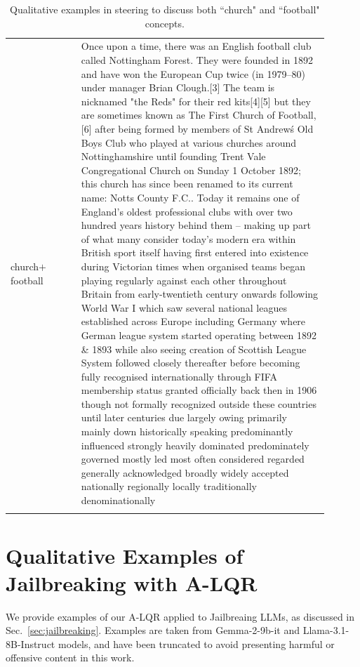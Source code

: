 \documentclass{article}
\theoremstyle{plain}
\theoremstyle{definition}
\theoremstyle{remark}
\begin{document}
\begin{table}[t]
\begin{tabular}{p{0.2\linewidth} p{0.7\linewidth}}
church$+$football & Once upon a time, there was an English football club called Nottingham Forest. They were founded in 1892 and have won the European Cup twice (in 1979–80) under manager Brian Clough.[3] The team is nicknamed "the Reds" for their red kits[4][5] but they are sometimes known as The First Church of Football,[6] after being formed by members of St Andrew\'s Old Boys Club who played at various churches around Nottinghamshire until founding Trent Vale Congregational Church on Sunday 1 October 1892; this church has since been renamed to its current name: Notts County F.C.. Today it remains one of England’s oldest professional clubs with over two hundred years history behind them – making up part of what many consider today’s modern era within British sport itself having first entered into existence during Victorian times when organised teams began playing regularly against each other throughout Britain from early-twentieth century onwards following World War I which saw several national leagues established across Europe including Germany where German league system started operating between 1892 \& 1893 while also seeing creation of Scottish League System followed closely thereafter before becoming fully recognised internationally through FIFA membership status granted officially back then in 1906 though not formally recognized outside these countries until later centuries due largely owing primarily mainly down historically speaking predominantly influenced strongly heavily dominated predominately governed mostly led most often considered regarded generally acknowledged broadly widely accepted nationally regionally locally traditionally denominationally \\
\addlinespace

\bottomrule
\end{tabular}
\caption{Qualitative examples in steering to discuss both ``church" and ``football" concepts.}
\label{ap:tab:multisteer-examples}
\end{table}

\FloatBarrier
\section{Qualitative Examples of Jailbreaking with A-LQR}\label{ap:jailbreak_examples}
We provide examples of our A-LQR applied to Jailbreaing LLMs, as discussed in Sec.~\ref{sec:jailbreaking}. Examples are taken from Gemma-2-9b-it and Llama-3.1-8B-Instruct models, and have been truncated to avoid presenting harmful or offensive content in this work. 
\end{document}
